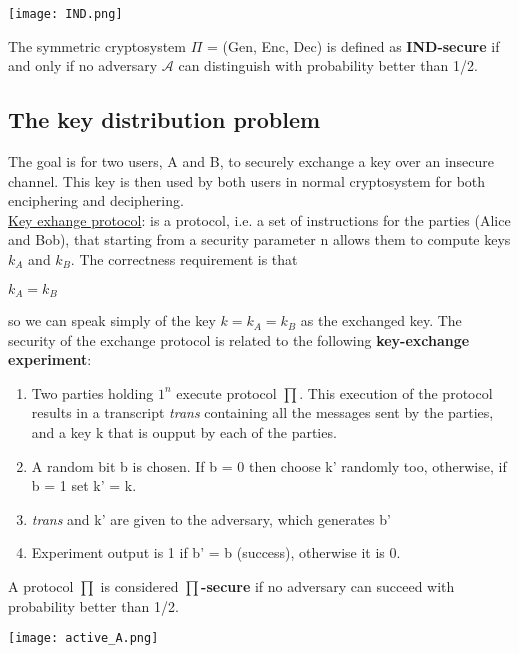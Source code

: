 \documentclass{article}
\begin{document}
\begin{center}
\texttt{[image: IND.png]}
\end{center}

The symmetric cryptosystem $\Pi$ = (Gen, Enc, Dec) is defined as \textbf{IND-secure} if and only if no adversary $\mathcal{A}$ can distinguish with probability better than 1/2.

\subsection{The key distribution problem}
The goal is for two users, A and B, to securely exchange a key over an insecure channel. This key is then used by both users in  normal cryptosystem for both enciphering and deciphering.\\

\underline{Key exhange protocol}: is a protocol, i.e. a set of instructions for the parties (Alice and Bob), that starting from
a security parameter n allows them to compute keys $k_A$ and $k_B$.
The correctness requirement is that
\begin{center}
    $k_A = k_B$
\end{center}
so we can speak simply of the key $k = k_A = k_B$ as the exchanged key.
The security of the exchange protocol is related to the following \textbf{key-exchange experiment}:\\
\begin{enumerate}
    \item Two parties holding $1^n$ execute protocol $\prod$. This execution of the protocol results in a transcript \textit{trans} containing all the messages sent by the parties, and a key k that is oupput by each of the parties.
    \item A random bit b is chosen. If b = 0 then choose k' randomly too, otherwise, if b = 1 set k' = k.
    \item \textit{trans} and k' are given to the adversary, which generates b'
    \item Experiment output is 1 if b' = b (success), otherwise it is 0.
\end{enumerate}
A protocol $\prod$ is considered \textbf{$\prod$-secure} if no adversary can succeed with probability better than 1/2.

\begin{center}
\texttt{[image: active\_A.png]}
\end{center}
\end{document}
